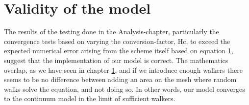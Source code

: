 \section{Validity of the model}
The results of the testing done in the Analysis-chapter, particularly the convergence tests based on varying the conversion-factor, Hc, to exceed the expected numerical error arising from the scheme itself based on equation \ref{}, suggest that the implementation of our model is correct. 
The mathematics overlap, as we have seen in chapter \ref{}, and if we introduce enough walkers there seems to be no difference between adding an area on the mesh where random walks solve the equation, and not doing so. 
In other words, our model converges to the continuum model in the limit of sufficient walkers.